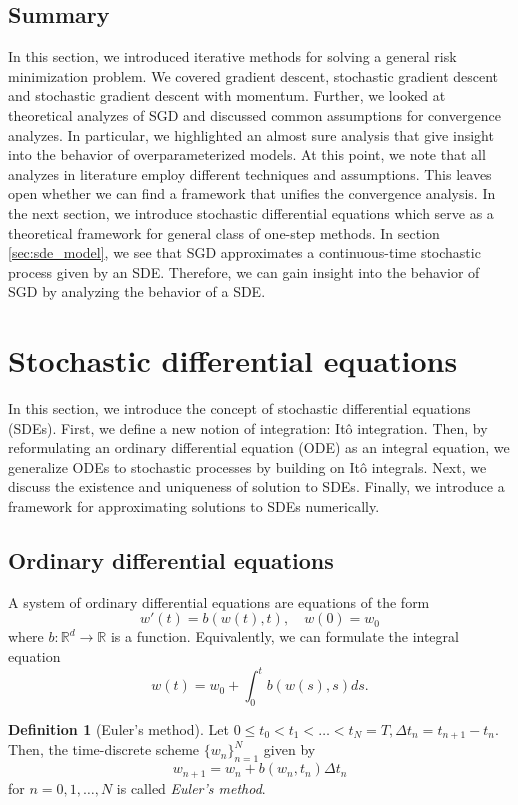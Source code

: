 \documentclass[12pt]{article}
\theoremstyle{definition}
\newtheorem{definition}[definition]{Definition}
\numberwithin{equation}{section}
\newcommand{\R}{\mathbb{R}}
\begin{document}
\subsection{Summary}
In this section, we introduced iterative methods for solving a general risk minimization problem. We covered gradient descent, stochastic gradient descent and stochastic gradient descent with momentum. Further, we looked at theoretical analyzes of SGD and discussed common assumptions for convergence analyzes. In particular, we highlighted an almost sure analysis that give insight into the behavior of overparameterized models. 
At this point, we note that all analyzes in literature employ different techniques and assumptions. This leaves open whether we can find a framework that unifies the convergence analysis. In the next section, we introduce stochastic differential equations which serve as a theoretical framework for general class of one-step methods. In section \ref{sec:sde_model}, we see that SGD approximates a continuous-time stochastic process given by an SDE. Therefore, we can gain insight into the behavior of SGD by analyzing the behavior of a SDE.

\section{Stochastic differential equations}
\label{sec:BackgroundSDETheory}
In this section, we introduce the concept of stochastic differential equations (SDEs). First, we define a new notion of integration: Itô integration. Then, by reformulating an ordinary differential equation (ODE) as an integral equation, we generalize ODEs to stochastic processes by building on Itô integrals. Next, we discuss the existence and uniqueness of solution to SDEs. Finally, we introduce a framework for approximating solutions to SDEs numerically.
\subsection{Ordinary differential equations}
A system of ordinary differential equations are equations of the form
\begin{equation}
  w'(t) = b(w(t),t), \quad w(0) = w_0
\end{equation}
where $b : \R^d \rightarrow \R$ is a function. Equivalently, we can formulate the integral equation
\begin{equation}
  w(t) = w_0 + \int_0^t b(w(s),s)ds.
\end{equation}
\begin{definition}[Euler's method]
  Let $0 \leq t_0 < t_1 < \dots < t_N = T, \Delta t_n = t_{n+1} - t_n$. Then, the time-discrete scheme $\{w_n\}_{n=1}^N$ given by
  \begin{equation}
    w_{n+1} = w_n + b(w_n, t_n) \Delta t_n
  \end{equation}
  for $n=0,1,\dots,N$ is called \emph{Euler's method}.
\end{definition}
\end{document}
